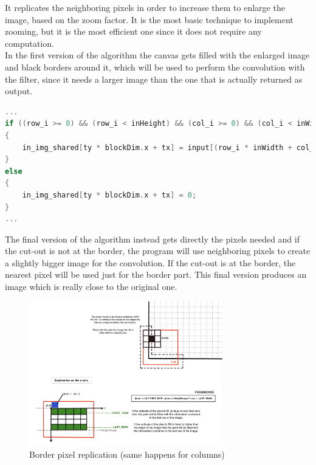     It replicates the neighboring pixels in order to increase them to enlarge the image, based on the zoom factor. It is the most basic technique to implement
    zooming, but it is the most efficient one since it does not require any computation.\\
    In the first version of the algorithm the canvas gets filled with the enlarged image and black borders around it,
    which will be used to perform the convolution with the filter, since it needs a larger image than the one that is actually returned as output.

    \noindent\begin{lstlisting}[language=C]
...
if ((row_i >= 0) && (row_i < inHeight) && (col_i >= 0) && (col_i < inWidth))
{
    in_img_shared[ty * blockDim.x + tx] = input[(row_i * inWidth + col_i) * 3 + color];
}
else
{
    in_img_shared[ty * blockDim.x + tx] = 0;
}
...
    \end{lstlisting}


    The final version of the algorithm instead gets directly the pixels needed and if the cut-out is not at the border, the program will use neighboring pixels
    to create a slightly bigger image for the convolution. If the cut-out is at the border, the nearest pixel will be used just for the border part.
    This final version produces an image which is really close to the original one.\\

    \begin{figure}
        \centering
        \includegraphics[width=0.75\textwidth]{img/EDGEscheme.png}
        \caption{Border pixel replication (same happens for columns)}
        \label{fig:borderrepl}
    \end{figure}


